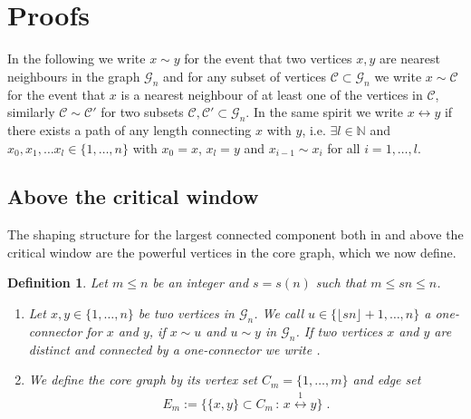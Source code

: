 \documentclass[12pt,a4paper]{article}
\numberwithin{equation}{section}
\newtheorem{definition}[shared]{Definition}
\begin{document}
\section{Proofs}

\newtheorem{4.1}{Theorem}[section]
In the following we write $x\sim y$ for the event that two vertices $x, y$ are nearest neighbours in the graph $\mathscr G_n$ and for any subset of vertices $\mathcal{C}\subset\mathscr{G}_n$ we write $x\sim \mathcal{C}$ for the event that $x$ is a nearest neighbour of at least one of the vertices in $\mathcal{C}$, similarly $ \mathcal{C}\sim \mathcal{C}'$ for two subsets $\mathcal{C},\mathcal{C}'\subset\mathscr{G}_n$.
In the same spirit we write $x\leftrightarrow y$ if there exists a path of any length connecting $x$ with $y$, i.e. $\exists l\in\mathbb N $ and $x_0,x_1,\ldots x_l\in\{1,\dots,n\}$ with $x_0=x$, $x_l=y$ and $x_{i-1}\sim x_i$ for all $i=1,\dots,l$.


\subsection{Above the critical window}

The shaping structure for the largest connected component both in and above the critical window are the powerful vertices in the core graph, which we now define.

\begin{definition} \label{def1}
Let $m\leq n$ be an integer and $s=s(n)$ such that $m\le sn \le n$. 
  \begin{enumerate}
    \item  Let $x,y \in \{1,\dots,n\}$ be two vertices in $\mathscr{G}_n$. We call $u\in\{ \lfloor sn \rfloor +1,
    \dots,n\}$ a \emph{one-connector} for $x$ and $y$, if $x\sim u$ and $u\sim y$ in $\mathscr{G}_{n}$. If two vertices $x$ and $y$ are distinct and connected by a one-connector we write .
    \item We define the \emph{core graph} by its vertex set $C_m=\{1,\dots,m\}$  and edge set
        \begin{align*}
            E_m:=\big\{\{x,y\}\subset C_m  \,:\, x\overset{1}{\longleftrightarrow} y   \big\}\;.
        \end{align*}
\end{enumerate}
\end{definition}  

   
\end{document}

